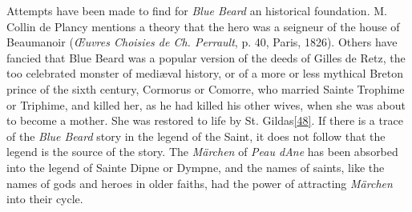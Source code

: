 \documentclass[14pt,a4paper]{memoir}
\begin{document}
Attempts have been made to find for \emph{Blue Beard} an historical
foundation. M. Collin de Plancy mentions a theory that the hero was a
seigneur of the house of Beaumanoir (\emph{Œuvres Choisies de Ch.
Perrault}, p. 40, Paris, 1826). Others have fancied that Blue Beard was
a popular version of the deeds of Gilles de Retz, the too celebrated
monster of mediæval history, or of a more or less mythical Breton prince
of the sixth century, Cormorus or Comorre, who married Sainte Trophime
or Triphime, and killed her, as he had killed his other wives, when she
was about to become a mother. She was restored to life by St.
Gildas\protect\hypertarget{4533318093929944247_33931-h-0.htm.xhtmlux5cux23FNanchor_48}{}{}\protect\hyperlink{4533318093929944247_33931-h-0.htm.xhtmlux5cux23Footnote_48}{{[}48{]}}.
If there is a trace of the \emph{Blue Beard} story in the legend of the
Saint, it does not follow that the legend is the source of the story.
The \emph{Märchen} of \emph{Peau d\textquotesingle Ane} has been
absorbed into the legend of Sainte Dipne or Dympne, and the names of
saints, like the names of gods and heroes in older faiths, had the power
of attracting \emph{Märchen} into their cycle.
\end{document}
